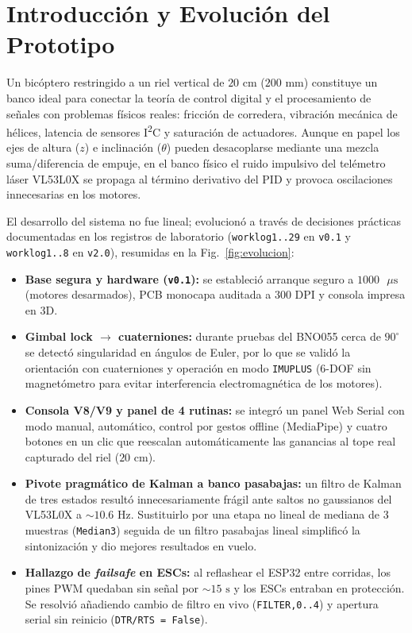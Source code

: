 \documentclass[conference]{IEEEtran}
\begin{document}
\section{Introducci\'{o}n y Evoluci\'{o}n del Prototipo}
Un bic\'{o}ptero restringido a un riel vertical de $20\text{ cm}$ ($200\text{ mm}$) constituye un banco ideal para conectar la teor\'{i}a de control digital y el procesamiento de se\~{n}ales con problemas f\'{i}sicos reales: fricci\'{o}n de corredera, vibraci\'{o}n mec\'{a}nica de h\'{e}lices, latencia de sensores I\textsuperscript{2}C y saturaci\'{o}n de actuadores. Aunque en papel los ejes de altura ($z$) e inclinaci\'{o}n ($\theta$) pueden desacoplarse mediante una mezcla suma/diferencia de empuje, en el banco f\'{i}sico el ruido impulsivo del tel\'{e}metro l\'{a}ser VL53L0X se propaga al t\'{e}rmino derivativo del PID y provoca oscilaciones innecesarias en los motores.

El desarrollo del sistema no fue lineal; evolucion\'{o} a trav\'{e}s de decisiones pr\'{a}cticas documentadas en los registros de laboratorio (\texttt{worklog1..29} en \texttt{v0.1} y \texttt{worklog1..8} en \texttt{v2.0}), resumidas en la Fig.~\ref{fig:evolucion}:
\begin{itemize}
  \item \textbf{Base segura y hardware (\texttt{v0.1}):} se estableci\'{o} arranque seguro a $1000\text{ }\mu\text{s}$ (motores desarmados), PCB monocapa auditada a $300\text{ DPI}$ y consola impresa en 3D.
  \item \textbf{Gimbal lock $\rightarrow$ cuaterniones:} durante pruebas del BNO055 cerca de $90^\circ$ se detect\'{o} singularidad en \'{a}ngulos de Euler, por lo que se valid\'{o} la orientaci\'{o}n con cuaterniones y operaci\'{o}n en modo \texttt{IMUPLUS} (6-DOF sin magnet\'{o}metro para evitar interferencia electromagn\'{e}tica de los motores).
  \item \textbf{Consola V8/V9 y panel de 4 rutinas:} se integr\'{o} un panel Web Serial con modo manual, autom\'{a}tico, control por gestos offline (MediaPipe) y cuatro botones en un clic que reescalan autom\'{a}ticamente las ganancias al tope real capturado del riel ($20\text{ cm}$).
  \item \textbf{Pivote pragm\'{a}tico de Kalman a banco pasabajas:} un filtro de Kalman de tres estados result\'{o} innecesariamente fr\'{a}gil ante saltos no gaussianos del VL53L0X a $\sim 10.6\text{ Hz}$. Sustituirlo por una etapa no lineal de mediana de 3 muestras (\texttt{Median3}) seguida de un filtro pasabajas lineal simplific\'{o} la sintonizaci\'{o}n y dio mejores resultados en vuelo.
  \item \textbf{Hallazgo de \textit{failsafe} en ESCs:} al reflashear el ESP32 entre corridas, los pines PWM quedaban sin se\~{n}al por $\sim 15\text{ s}$ y los ESCs entraban en protecci\'{o}n. Se resolvi\'{o} a\~{n}adiendo cambio de filtro en vivo (\texttt{FILTER,0..4}) y apertura serial sin reinicio (\texttt{DTR/RTS = False}).
\end{itemize}
\end{document}
